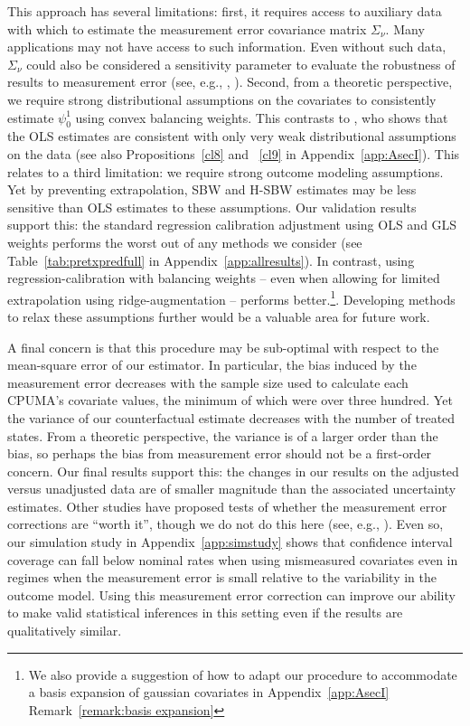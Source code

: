 \documentclass[aoas]{imsart}
\theoremstyle{plain}
\theoremstyle{remark}
\begin{document}
This approach has several limitations: first, it requires access to auxiliary data with which to estimate the measurement error covariance matrix $\Sigma_{\nu}$. Many applications may not have access to such information. Even without such data, $\Sigma_{\nu}$ could also be considered a sensitivity parameter to evaluate the robustness of results to measurement error (see, e.g., \cite{huque2014impact}, \cite{illenberger2020impact}). Second, from a theoretic perspective, we require strong distributional assumptions on the covariates to consistently estimate $\psi_0^1$ using convex balancing weights. This contrasts to \cite{gleser1992importance}, who shows that the OLS estimates are consistent with only very weak distributional assumptions on the data (see also Propositions~\ref{cl8} and ~\ref{cl9} in Appendix~\ref{app:AsecI}). This relates to a third limitation: we require strong outcome modeling assumptions. Yet by preventing extrapolation, SBW and H-SBW estimates may be less sensitive than OLS estimates to these assumptions. Our validation results support this: the standard regression calibration adjustment using OLS and GLS weights performs the worst out of any methods we consider (see Table~\ref{tab:pretxpredfull} in Appendix~\ref{app:allresults}). In contrast, using regression-calibration with balancing weights -- even when allowing for limited extrapolation using ridge-augmentation -- performs better.\footnote{We also provide a suggestion of how to adapt our procedure to accommodate a basis expansion of gaussian covariates in Appendix~\ref{app:AsecI} Remark~\ref{remark:basis expansion}}. Developing methods to relax these assumptions further would be a valuable area for future work.

A final concern is that this procedure may be sub-optimal with respect to the mean-square error of our estimator. In particular, the bias induced by the measurement error decreases with the sample size used to calculate each CPUMA's covariate values, the minimum of which were over three hundred. Yet the variance of our counterfactual estimate decreases with the number of treated states. From a theoretic perspective, the variance is of a larger order than the bias, so perhaps the bias from measurement error should not be a first-order concern. Our final results support this: the changes in our results on the adjusted versus unadjusted data are of smaller magnitude than the associated uncertainty estimates. Other studies have proposed tests of whether the measurement error corrections are ``worth it'', though we do not do this here (see, e.g., \cite{gleser1992importance}). Even so, our simulation study in Appendix~\ref{app:simstudy} shows that confidence interval coverage can fall below nominal rates when using mismeasured covariates even in regimes when the measurement error is small relative to the variability in the outcome model. Using this measurement error correction can improve our ability to make valid statistical inferences in this setting even if the results are qualitatively similar.
\end{document}
